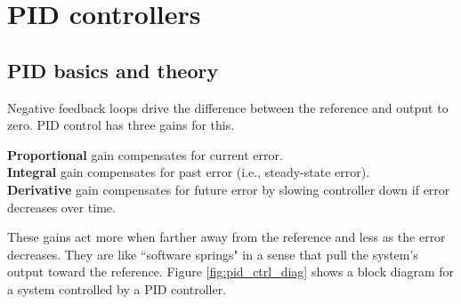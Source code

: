 
\chapter{PID controllers}

\section{PID basics and theory}

Negative feedback loops drive the difference between the \gls{reference} and
\gls{output} to zero. PID control has three gains for this.

\textbf{Proportional} gain compensates for current \gls{error}. \\
\textbf{Integral} gain compensates for past error (i.e.,
\gls{steady-state error}). \\
\textbf{Derivative} gain compensates for future error by slowing controller down
if error decreases over time.

These gains act more when farther away from the \gls{reference} and less as the
error decreases. They are like ``software springs" in a sense that pull the
system's \gls{output} toward the \gls{reference}. Figure \ref{fig:pid_ctrl_diag}
shows a block diagram for a system controlled by a PID controller.

